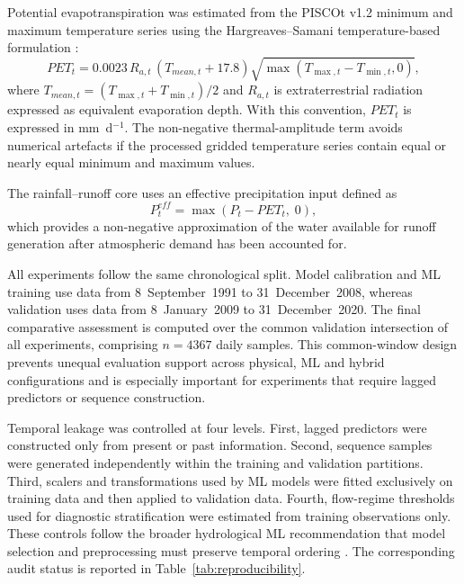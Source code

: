 Potential evapotranspiration was estimated from the PISCOt v1.2
minimum and maximum temperature series using the Hargreaves--Samani
temperature-based formulation \citep{hargreaves1985reference}:
\begin{equation}
PET_t = 0.0023\,R_{a,t}\,(T_{mean,t}+17.8)
        \sqrt{\max(T_{\max,t}-T_{\min,t},0)},
\label{eq:hargreaves-samani}
\end{equation}
where $T_{mean,t}=(T_{\max,t}+T_{\min,t})/2$ and $R_{a,t}$ is
extraterrestrial radiation expressed as equivalent evaporation depth.
With this convention, $PET_t$ is expressed in mm~d$^{-1}$. The
non-negative thermal-amplitude term avoids numerical artefacts if the
processed gridded temperature series contain equal or nearly equal
minimum and maximum values.

The rainfall--runoff core uses an effective precipitation input defined
as
\begin{equation}
P^{eff}_t = \max(P_t - PET_t,\;0),
\label{eq:peff}
\end{equation}
which provides a non-negative approximation of the water available for
runoff generation after atmospheric demand has been accounted for.

All experiments follow the same chronological split. Model calibration
and ML training use data from 8~September~1991 to 31~December~2008,
whereas validation uses data from 8~January~2009 to 31~December~2020.
The final comparative assessment is computed over the common validation
intersection of all experiments, comprising $n=4367$ daily samples. This
common-window design prevents unequal evaluation support across
physical, ML and hybrid configurations and is especially important for
experiments that require lagged predictors or sequence construction.

Temporal leakage was controlled at four levels. First, lagged predictors
were constructed only from present or past information. Second,
sequence samples were generated independently within the training and
validation partitions. Third, scalers and transformations used by ML
models were fitted exclusively on training data and then applied to
validation data. Fourth, flow-regime thresholds used for diagnostic
stratification were estimated from training observations only. These
controls follow the broader hydrological ML recommendation that model
selection and preprocessing must preserve temporal ordering
\citep{arsenault2022continuous,chen2013finding}. The corresponding
audit status is reported in Table~\ref{tab:reproducibility}.

